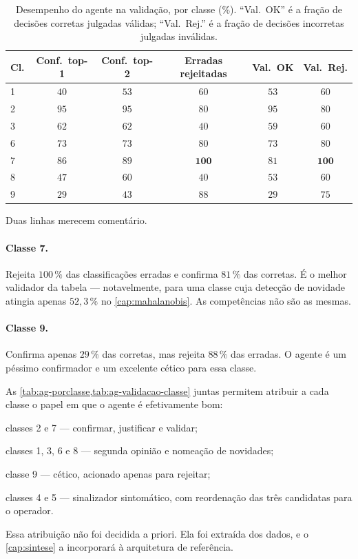 \begin{table}[htbp]
\centering
\caption{Desempenho do agente na validação, por classe (\%). ``Val.\ OK'' é a fração de
decisões corretas julgadas válidas; ``Val.\ Rej.'' é a fração de decisões incorretas
julgadas inválidas.}
\label{tab:ag-validacao-classe}
\small
\begin{tabular}{lccccc}
\toprule
\textbf{Cl.} & \textbf{Conf.\ top-1} & \textbf{Conf.\ top-2} &
\textbf{Erradas rejeitadas} & \textbf{Val.\ OK} & \textbf{Val.\ Rej.} \\
\midrule
1 & $40$ & $53$ & $60$ & $53$ & $60$ \\
2 & $95$ & $95$ & $80$ & $95$ & $80$ \\
3 & $62$ & $62$ & $40$ & $59$ & $60$ \\
6 & $73$ & $73$ & $80$ & $73$ & $80$ \\
7 & $86$ & $89$ & $\bm{100}$ & $81$ & $\bm{100}$ \\
8 & $47$ & $60$ & $40$ & $53$ & $60$ \\
9 & $29$ & $43$ & $88$ & $29$ & $75$ \\
\bottomrule
\end{tabular}
\end{table}

Duas linhas merecem comentário.

\paragraph{Classe 7.} Rejeita $100\,\%$ das classificações erradas e confirma $81\,\%$
das corretas. É o melhor validador da tabela --- notavelmente, para uma classe cuja
detecção de novidade atingia apenas $52{,}3\,\%$ no \cref{cap:mahalanobis}. As
competências não são as mesmas.

\paragraph{Classe 9.} Confirma apenas $29\,\%$ das corretas, mas rejeita $88\,\%$ das
erradas. O agente é um péssimo confirmador e um excelente cético para essa classe.

\begin{destaque}
As \cref{tab:ag-porclasse,tab:ag-validacao-classe} juntas permitem atribuir a cada classe
o papel em que o agente é efetivamente bom:

classes 2 e 7 --- confirmar, justificar e validar;

classes 1, 3, 6 e 8 --- segunda opinião e nomeação de novidades;

classe 9 --- cético, acionado apenas para rejeitar;

classes 4 e 5 --- sinalizador sintomático, com reordenação das três candidatas para o
operador.

Essa atribuição não foi decidida a priori. Ela foi extraída dos dados, e o
\cref{cap:sintese} a incorporará à arquitetura de referência.
\end{destaque}

